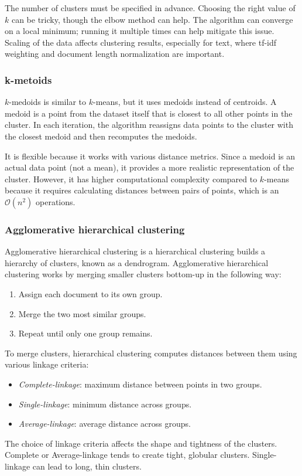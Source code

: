 The number of clusters must be specified in advance.
Choosing the right value of $k$ can be tricky, though the elbow method can help.
The algorithm can converge on a local minimum; running it multiple times can help mitigate this issue.
Scaling of the data affects clustering results, especially for text, where tf-idf weighting and document length normalization are important.

\subsubsection{k-metoids}
$k$-medoids is similar to $k$-means, but it uses medoids instead of centroids.
A medoid is a point from the dataset itself that is closest to all other points in the cluster.
In each iteration, the algorithm reassigns data points to the cluster with the closest medoid and then recomputes the medoids.

It is flexible because it works with various distance metrics. 
Since a medoid is an actual data point (not a mean), it provides a more realistic representation of the cluster.
However, it has higher computational complexity compared to $k$-means because it requires calculating distances between pairs of points, which is an $\mathcal{O}(n^2)$ operations.

\subsubsection{Agglomerative hierarchical clustering}
Agglomerative hierarchical clustering is a hierarchical clustering builds a hierarchy of clusters, known as a dendrogram.
Agglomerative hierarchical clustering works by merging smaller clusters bottom-up in the following way: 
\begin{enumerate}
    \item Assign each document to its own group.
    \item Merge the two most similar groups.
    \item Repeat until only one group remains.
\end{enumerate}
\noindent To merge clusters, hierarchical clustering computes distances between them using various linkage criteria:
\begin{itemize}
    \item \textit{Complete-linkage}: maximum distance between points in two groups.
    \item \textit{Single-linkage}: minimum distance across groups.
    \item \textit{Average-linkage}: average distance across groups.
\end{itemize}
\noindent The choice of linkage criteria affects the shape and tightness of the clusters. 
Complete or Average-linkage tends to create tight, globular clusters.
Single-linkage can lead to long, thin clusters.


